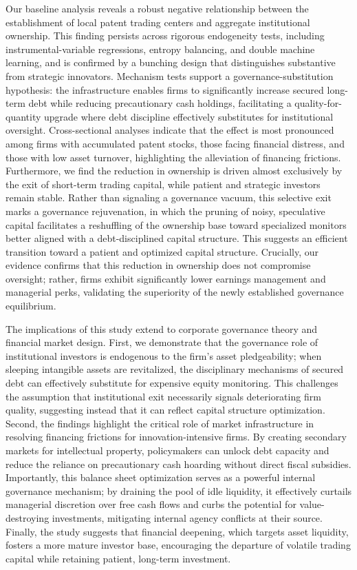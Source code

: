 \documentclass[12pt,a4paper]{article}
\begin{document}
Our baseline analysis reveals a robust negative relationship between the establishment of local patent trading centers and aggregate institutional ownership. This finding persists across rigorous endogeneity tests, including instrumental-variable regressions, entropy balancing, and double machine learning, and is confirmed by a bunching design that distinguishes substantive from strategic innovators. Mechanism tests support a governance-substitution hypothesis: the infrastructure enables firms to significantly increase secured long-term debt while reducing precautionary cash holdings, facilitating a quality-for-quantity upgrade where debt discipline effectively substitutes for institutional oversight. Cross-sectional analyses indicate that the effect is most pronounced among firms with accumulated patent stocks, those facing financial distress, and those with low asset turnover, highlighting the alleviation of financing frictions. Furthermore, we find the reduction in ownership is driven almost exclusively by the exit of short-term trading capital, while patient and strategic investors remain stable. Rather than signaling a governance vacuum, this selective exit marks a governance rejuvenation, in which the pruning of noisy, speculative capital facilitates a reshuffling of the ownership base toward specialized monitors better aligned with a debt-disciplined capital structure. This suggests an efficient transition toward a patient and optimized capital structure. Crucially, our evidence confirms that this reduction in ownership does not compromise oversight; rather, firms exhibit significantly lower earnings management and managerial perks, validating the superiority of the newly established governance equilibrium.

The implications of this study extend to corporate governance theory and financial market design. First, we demonstrate that the governance role of institutional investors is endogenous to the firm’s asset pledgeability; when sleeping intangible assets are revitalized, the disciplinary mechanisms of secured debt can effectively substitute for expensive equity monitoring. This challenges the assumption that institutional exit necessarily signals deteriorating firm quality, suggesting instead that it can reflect capital structure optimization. Second, the findings highlight the critical role of market infrastructure in resolving financing frictions for innovation-intensive firms. By creating secondary markets for intellectual property, policymakers can unlock debt capacity and reduce the reliance on precautionary cash hoarding without direct fiscal subsidies. Importantly, this balance sheet optimization serves as a powerful internal governance mechanism; by draining the pool of idle liquidity, it effectively curtails managerial discretion over free cash flows and curbs the potential for value-destroying investments, mitigating internal agency conflicts at their source. Finally, the study suggests that financial deepening, which targets asset liquidity, fosters a more mature investor base, encouraging the departure of volatile trading capital while retaining patient, long-term investment.
\end{document}

